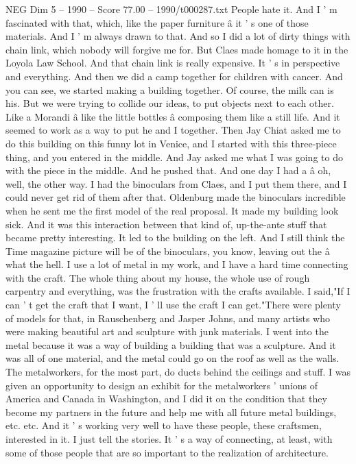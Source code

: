 \begin{textsample}{NEG Dim 5 – 1990 – Score 77.00 – 1990/t000287.txt}
People hate it.
And I ' m fascinated with that, which, like the paper furniture â it ' s one of those materials.
And I ' m always drawn to that.
And so I did a lot of dirty things with chain link, which nobody will forgive me for.
But Claes made homage to it in the Loyola Law School.
And that chain link is really expensive.
It ' s in perspective and everything.
And then we did a camp together for children with cancer.
And you can see, we started making a building together.
Of course, the milk can is his.
But we were trying to collide our ideas, to put objects next to each other.
Like a Morandi â like the little bottles â composing them like a still life.
And it seemed to work as a way to put he and I together.
Then Jay Chiat asked me to do this building on this funny lot in Venice, and I started with this three-piece thing, and you entered in the middle.
And Jay asked me what I was going to do with the piece in the middle.
And he pushed that.
And one day I had a â oh, well, the other way.
I had the binoculars from Claes, and I put them there, and I could never get rid of them after that.
Oldenburg made the binoculars incredible when he sent me the first model of the real proposal.
It made my building look sick.
And it was this interaction between that kind of, up-the-ante stuff that became pretty interesting.
It led to the building on the left.
And I still think the Time magazine picture will be of the binoculars, you know, leaving out the â what the hell.
I use a lot of metal in my work, and I have a hard time connecting with the craft.
The whole thing about my house, the whole use of rough carpentry and everything, was the frustration with the crafts available.
I said,"If I can ' t get the craft that I want, I ' ll use the craft I can get."There were plenty of models for that, in Rauschenberg and Jasper Johns, and many artists who were making beautiful art and sculpture with junk materials.
I went into the metal because it was a way of building a building that was a sculpture.
And it was all of one material, and the metal could go on the roof as well as the walls.
The metalworkers, for the most part, do ducts behind the ceilings and stuff.
I was given an opportunity to design an exhibit for the metalworkers ' unions of America and Canada in Washington, and I did it on the condition that they become my partners in the future and help me with all future metal buildings, etc. etc.
And it ' s working very well to have these people, these craftsmen, interested in it.
I just tell the stories.
It ' s a way of connecting, at least, with some of those people that are so important to the realization of architecture.

\end{textsample}
